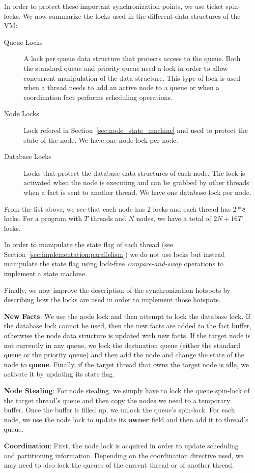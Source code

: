 In order to protect these important synchronization points, we use ticket spin-locks.
We now summarize the locks used in the different data structures of the VM:

\begin{description}
   \item[Queue Locks] A lock per queue data structure that protects access to the queue. Both the standard queue and priority queue need a lock in order to allow concurrent manipulation of the data structure. This type of lock is used when a thread needs to add an active node to a queue or when a coordination fact performs scheduling operations.
   \item[Node Locks] Lock refered in Section~\ref{sec:node_state_machine} and used to protect the state of the node. We have one node lock per node.
   \item[Database Locks] Locks that protect the database data structures of each node. The lock is activated when the node is executing and can be grabbed by other threads when a fact is sent to another thread. We have one database lock per node.
\end{description}

From the list above, we see that each node has 2 locks and each thread has $2 * 8$ locks. For a program with $T$ threads and $N$ nodes, we have a total of $2N + 16T$ locks.

In order to manipulate the state flag of each thread (see Section~\ref{sec:implementation:parallelism}) we do not use locks but instead manipulate the state flag using lock-free \emph{compare-and-swap} operations to implement a state machine.

Finally, we now improve the description of the synchronization hotspots by describing how the locks are used in order to implement those hotspots.

\begin{description}
\item \textbf{New Facts}: We use the node lock and then attempt to lock the database lock. If the database lock cannot be used, then the new facts are added to the fact buffer, otherwise the node data structure is updated with new facts. If the target node is not currently in any queue, we lock the destination queue (either the standard queue or the priority queue) and then add the node and change the state of the node to \textbf{queue}. Finally, if the target thread that owns the target node is idle, we activate it by updating its state flag.
\item \textbf{Node Stealing}: For node stealing, we simply have to lock the queue spin-lock of the target thread's queue and then copy the nodes we need to a temporary buffer. Once the buffer is filled up, we unlock the queue's spin-lock. For each node, we use the node lock to update its \textbf{owner} field and then add it to thread's queue.
\item \textbf{Coordination}: First, the node lock is acquired in order to update scheduling and partitioning information. Depending on the coordination directive used, we may need to also lock the queues of the current thread or of another thread.
\end{description}

